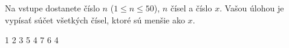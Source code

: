




Na vstupe dostanete číslo $n$ ($1\leq n \leq 50$), $n$ čísel a číslo $x$. Vašou úlohou je vypísať súčet
všetkých čísel, ktoré sú menšie ako $x$.

1 2 3 5 4 7 6
4
\koniec


